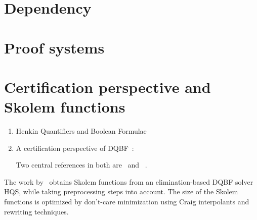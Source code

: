 \documentclass{article}
\begin{document}
\section{Dependency}

\section{Proof systems}

\section{Certification perspective and Skolem functions}

\begin{enumerate}
	\item Henkin Quantifiers and Boolean Formulae~\cite{balabanov2012henkin}
	
	\item A certification perspective of DQBF~\cite{balabanov2014henkin}:
	
	Two central references in both are~\cite{bubeck2006dependency} and ~\cite{bubeck2010model}. 
\end{enumerate}

The work by~\cite{wimmer2016skolem} obtains Skolem functions from an elimination-based DQBF solver HQS, while taking preprocessing steps into account.
%
The size of the Skolem functions is optimized by don’t-care minimization using Craig interpolants and rewriting techniques.



\end{document}
